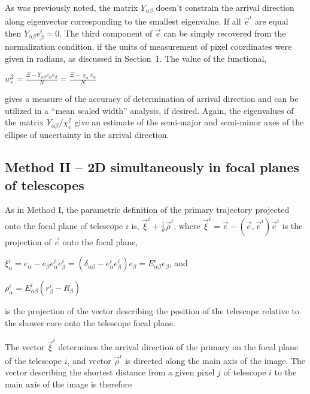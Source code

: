\documentclass[letterpaper]{article}
\begin{document}
As was previously noted, the matrix $Y_{\alpha\beta}$ doesn't
constrain the arrival direction along eigenvector corresponding to the
smallest eigenvalue. If all $\vec{e}^{i}$ are equal then
$Y_{\alpha\beta}e_{\beta }^{i}=0$. The third component of $\vec{e}$
can be simply recovered from the normalization condition, if the units of
measurement of pixel coordinates were given in radians, as discussed
in Section~1. The value of the functional,

$\displaystyle w_{e}^{2}=\frac{\Xi-Y_{\alpha\beta}e_{\alpha}e_{\beta}}{N}
=\frac{\Xi-\digamma_{\alpha}e_{\alpha}}{N}$

gives a measure of the accuracy of determination of arrival direction
and can be utilized in a ``mean scaled width'' analysis, if desired.
Again, the eigenvalues of the matrix $Y_{\alpha\beta}/\chi_e^{2}$ give
an estimate of the semi-major and semi-minor axes of the ellipse of
uncertainty in the arrival direction.

%
%

\subsection{Method II -- 2D simultaneously in focal planes of telescopes}

As in Method I, the parametric definition of the primary trajectory
projected onto the focal plane of telescope $i$ is,
$\vec{\xi}^{i}+\frac{1}{\vartheta}\vec{\rho}^{i}$, where
$\displaystyle \vec{\xi}^{i}=\vec{e}-\left(\vec{e},\vec{e}^{i}\right)
\vec{e}^{i}$ is the projection of $\vec{e}$ onto the focal plane,

$\displaystyle \xi_{\alpha}^{i}=e_{\alpha}-e_{\beta}e_{\alpha
}^{i}e_{\beta}^{i}=\left(\delta_{\alpha\beta}
-e_{\alpha}^{i}e_{\beta}^{i}\right)e_{\beta}=E_{\alpha\beta}^{i}e_{\beta}$,
and

$\displaystyle \rho_{\alpha}^{i}
=E_{\alpha\beta}^{i}(r_{\beta}^{i}-R_{\beta})$

is the projection of the vector describing the position of the
telescope relative to the shower core onto the telescope focal plane.

The vector $\vec{\xi}^{i}$ determines the arrival direction of the
primary on the focal plane of the telescope $i$, and vector
$\vec{\rho}^{i}$ is directed along the main axis of the image. The
vector describing the shortest distance from a given pixel $j$ of
telescope $i$ to the main axis of the image is therefore
\end{document}
